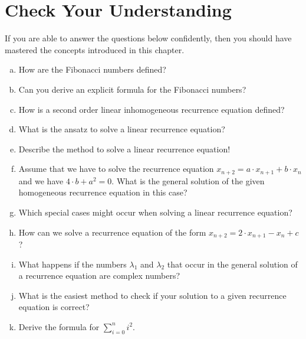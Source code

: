 \section{Check Your Understanding}
If you are able to answer the questions below confidently, then you should have mastered the concepts
introduced in this chapter.
\begin{enumerate}[(a)]
\item How are the Fibonacci numbers defined?
\item Can you derive an explicit formula for the Fibonacci numbers?
\item How is a second order linear inhomogeneous recurrence equation defined?  
\item What is the ansatz to solve a linear  recurrence equation?
\item Describe the method to solve a linear  recurrence equation!
\item Assume that we have to solve the recurrence equation $x_{n+2} = a \cdot x_{n+1} + b \cdot x_n$
      and we have $4 \cdot b + a^2 = 0$.  What is the general solution of the given homogeneous
      recurrence equation in this case?
\item Which special cases might occur when solving a linear recurrence equation?
\item How can we solve a recurrence equation of the form $x_{n+2} = 2 \cdot x_{n+1} - x_n + c$?
\item What happens if the numbers $\lambda_1$ and $\lambda_2$ that occur in the general solution
      of a recurrence equation are complex numbers?
\item What is the easiest method to check if your solution to a given recurrence equation is correct?  
\item Derive the formula for $\sum\limits_{i=0}^n i^2$.
\end{enumerate}


